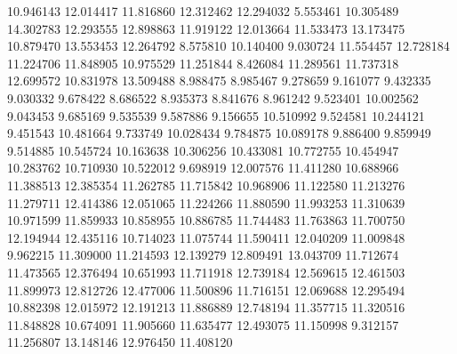 10.946143
12.014417
11.816860
12.312462
12.294032
5.553461
10.305489
14.302783
12.293555
12.898863
11.919122
12.013664
11.533473
13.173475
10.879470
13.553453
12.264792
8.575810
10.140400
9.030724
11.554457
12.728184
11.224706
11.848905
10.975529
11.251844
8.426084
11.289561
11.737318
12.699572
10.831978
13.509488
8.988475
8.985467
9.278659
9.161077
9.432335
9.030332
9.678422
8.686522
8.935373
8.841676
8.961242
9.523401
10.002562
9.043453
9.685169
9.535539
9.587886
9.156655
10.510992
9.524581
10.244121
9.451543
10.481664
9.733749
10.028434
9.784875
10.089178
9.886400
9.859949
9.514885
10.545724
10.163638
10.306256
10.433081
10.772755
10.454947
10.283762
10.710930
10.522012
9.698919
12.007576
11.411280
10.688966
11.388513
12.385354
11.262785
11.715842
10.968906
11.122580
11.213276
11.279711
12.414386
12.051065
11.224266
11.880590
11.993253
11.310639
10.971599
11.859933
10.858955
10.886785
11.744483
11.763863
11.700750
12.194944
12.435116
10.714023
11.075744
11.590411
12.040209
11.009848
9.962215
11.309000
11.214593
12.139279
12.809491
13.043709
11.712674
11.473565
12.376494
10.651993
11.711918
12.739184
12.569615
12.461503
11.899973
12.812726
12.477006
11.500896
11.716151
12.069688
12.295494
10.882398
12.015972
12.191213
11.886889
12.748194
11.357715
11.320516
11.848828
10.674091
11.905660
11.635477
12.493075
11.150998
9.312157
11.256807
13.148146
12.976450
11.408120
